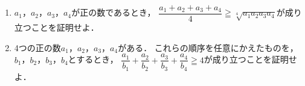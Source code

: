 \documentclass[../../main.tex]{subfiles}
\begin{document}
\begin{enumerate}
  \item $a_1$，$a_2$，$a_3$，$a_4$が正の数であるとき，
    $\displaystyle\dfrac{a_1+a_2+a_3+a_4}{4}\geqq\sqrt[4]{a_1a_2a_3a_4}$が成り立つことを証明せよ．
  \item 4つの正の数$a_1$，$a_2$，$a_3$，$a_4$がある．
    これらの順序を任意にかえたものを，$b_1$，$b_2$，$b_3$，$b_4$とするとき，
    $\displaystyle\dfrac{a_1}{b_1}+\dfrac{a_2}{b_2}+\dfrac{a_3}{b_3}+\dfrac{a_4}{b_4}\geqq4$が成り立つことを証明せよ．
\end{enumerate}
\end{document}
